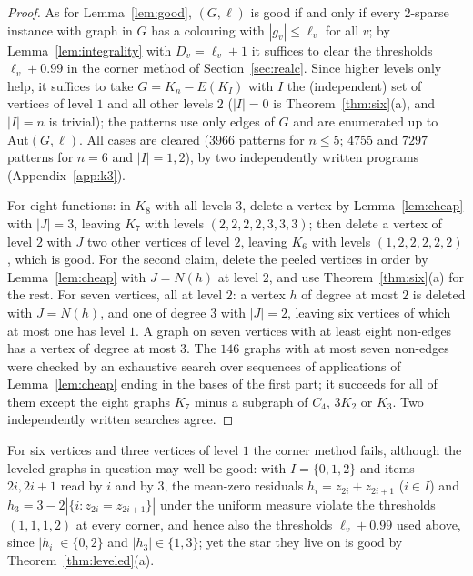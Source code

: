 \documentclass[11pt,letterpaper]{article}
\theoremstyle{definition}
\begin{document}
\begin{proof}
As for Lemma~\ref{lem:good}, $(G,\ell)$ is good if and only if every $2$-sparse instance with graph in
$G$ has a colouring with $|g_v|\le\ell_v$ for all $v$; by Lemma~\ref{lem:integrality} with $D_v=\ell_v+1$ it
suffices to clear the thresholds $\ell_v+0.99$ in the corner method of Section~\ref{sec:realc}. Since
higher levels only help, it suffices to take $G=K_n-E(K_I)$ with $I$ the (independent) set of vertices
of level $1$ and all other levels $2$ ($|I|=0$ is Theorem~\ref{thm:six}(a), and $|I|=n$ is trivial); the
patterns use only edges of $G$ and are enumerated up to $\mathrm{Aut}(G,\ell)$. All cases are cleared ($3966$ patterns for $n\le5$; $4755$ and $7297$ patterns
for $n=6$ and $|I|=1,2$), by two independently written programs (Appendix~\ref{app:k3}).

For eight functions: in $K_8$ with all levels $3$, delete a vertex by Lemma~\ref{lem:cheap} with
$|J|=3$, leaving $K_7$ with levels $(2,2,2,2,3,3,3)$; then delete a vertex of level $2$ with $J$ two other
vertices of level $2$, leaving $K_6$ with levels $(1,2,2,2,2,2)$, which is good. For the second claim,
delete the peeled vertices in order by Lemma~\ref{lem:cheap} with $J=N(h)$ at level $2$, and use
Theorem~\ref{thm:six}(a) for the rest. For seven vertices, all at level $2$: a vertex $h$ of degree at
most $2$ is deleted with $J=N(h)$, and one of degree $3$ with $|J|=2$, leaving six vertices of which at
most one has level $1$. A graph on seven vertices with at least eight non-edges has a vertex of
degree at most $3$. The $146$ graphs with at most seven non-edges were checked by an exhaustive search
over sequences of applications of Lemma~\ref{lem:cheap} ending in the bases of the first part; it
succeeds for all of them except the eight graphs $K_7$ minus a subgraph of $C_4$, $3K_2$ or $K_3$. Two
independently written searches agree.
\end{proof}

For six vertices and three vertices of level $1$ the corner method fails, although the leveled graphs
in question may well be good: with $I=\{0,1,2\}$ and items $2i,2i+1$ read by $i$ and by $3$, the
mean-zero residuals $h_i=z_{2i}+z_{2i+1}$ ($i\in I$) and $h_3=3-2|\{i:z_{2i}=z_{2i+1}\}|$ under the uniform
measure violate the thresholds $(1,1,1,2)$ at every corner, and hence also the thresholds $\ell_v+0.99$
used above, since $|h_i|\in\{0,2\}$ and $|h_3|\in\{1,3\}$; yet the star they live on is good by
Theorem~\ref{thm:leveled}(a).
\end{document}
